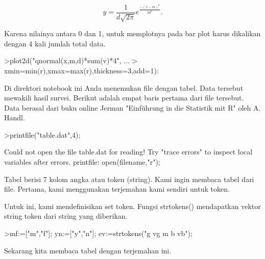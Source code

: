 \documentclass[a4paper,10pt]{article}
\begin{document}
\begin{eulernotebook}
\begin{eulercomment}
\begin{eulercomment}
\begin{eulercomment}
\begin{eulercomment}
\begin{eulercomment}
\begin{eulercomment}
\begin{eulercomment}
\begin{eulercomment}
\begin{eulercomment}
\begin{eulercomment}
\begin{eulercomment}
\begin{eulercomment}
\begin{eulercomment}
\begin{eulercomment}
\begin{eulercomment}
\begin{eulercomment}
\begin{eulercomment}
\begin{eulercomment}
\begin{eulercomment}
\end{eulercomment}
\begin{eulerformula}
\[
y=\frac{1}{d\sqrt{2\pi}}e^{\frac{-(x-m)^2}{2d^2}}.
\]
\end{eulerformula}
\begin{eulercomment}
Karena nilainya antara 0 dan 1, untuk memplotnya pada bar plot harus
dikalikan dengan 4 kali jumlah total data.
\end{eulercomment}
\begin{eulerprompt}
>plot2d("qnormal(x,m,d)*sum(v)*4", ...
>  xmin=min(r),xmax=max(r),thickness=3,add=1):
\end{eulerprompt}
\begin{eulercomment}
Di direktori notebook ini Anda menemukan file dengan tabel. Data
tersebut mewakili hasil survei. Berikut adalah empat baris pertama
dari file tersebut. Data berasal dari buku online Jerman "Einführung
in die Statistik mit R" oleh A. Handl.
\end{eulercomment}
\begin{eulerprompt}
>printfile("table.dat",4);
\end{eulerprompt}
\begin{euleroutput}
  Could not open the file
  table.dat
  for reading!
  Try "trace errors" to inspect local variables after errors.
  printfile:
      open(filename,"r");
\end{euleroutput}
\begin{eulercomment}
Tabel berisi 7 kolom angka atau token (string). Kami ingin membaca
tabel dari file. Pertama, kami menggunakan terjemahan kami sendiri
untuk token.

Untuk ini, kami mendefinisikan set token. Fungsi strtokens()
mendapatkan vektor string token dari string yang diberikan.
\end{eulercomment}
\begin{eulerprompt}
>mf:=["m","f"]; yn:=["y","n"]; ev:=strtokens("g vg m b vb");
\end{eulerprompt}
\begin{eulercomment}
Sekarang kita membaca tabel dengan terjemahan ini.


\end{eulercomment}
\end{eulercomment}
\end{eulercomment}
\end{eulercomment}
\end{eulercomment}
\end{eulercomment}
\end{eulercomment}
\end{eulercomment}
\end{eulercomment}
\end{eulercomment}
\end{eulercomment}
\end{eulercomment}
\end{eulercomment}
\end{eulercomment}
\end{eulercomment}
\end{eulercomment}
\end{eulercomment}
\end{eulercomment}
\end{eulercomment}
\end{eulernotebook}
\end{document}

